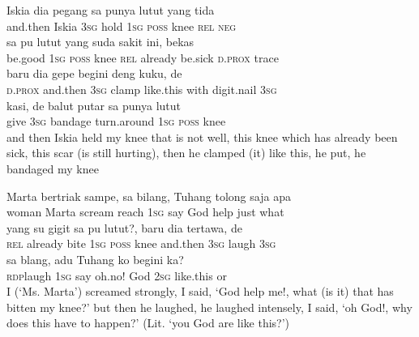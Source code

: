 \ea
{}    {Iskia}    {dia}    {pegang}    {sa}    {punya}    {lutut}   yang    {tida}\\
   {and.then}    {Iskia}    {\textsc{3sg}}    {hold}    {\textsc{1sg}}    {\textsc{poss}}    {knee}   \textsc{rel}    {\textsc{neg}}\\
    {sa}    {pu}    {lutut}    {yang}    {suda}    {sakit}    {ini,}   bekas\\
   {be.good}    {\textsc{1sg}}    {\textsc{poss}}    {knee}    {\textsc{rel}}    {already}    {be.sick}    {\textsc{d.prox}}   trace\\
    {baru}    {dia}    {gepe}    {begini}    {deng}    {kuku,}   de\\
   {\textsc{d.prox}}    {and.then}    {\textsc{3sg}}    {clamp}    {like.this}    {with}    {digit.nail}   \textsc{3sg}\\
\gll kasi,    {de}    {balut}    {putar}    {sa}    {punya}    {lutut}\\
  give    {\textsc{3sg}}    {bandage}    {turn.around}    {\textsc{1sg}}    {\textsc{poss}}    {knee}\\
\glt
and then Iskia held my knee that is not well, this knee which has already been sick, this scar (is still hurting), then he clamped (it) like this, he put, he bandaged my knee
\z

\ea
{}    {Marta}    {bertriak}    {sampe,}    {sa}    {bilang,}    {Tuhang}    {tolong}    {saja}   apa\\
   {woman}    {Marta}    {scream}    {reach}    {\textsc{1sg}}    {say}    {God}    {help}    {just}   what\\
\gll yang    {su}    {gigit}    {sa}    {pu}    {lutut?,}    {baru}    {dia}    {tertawa,}    {de}\\
  \textsc{rel}    {already}    {bite}    {\textsc{1sg}}    {\textsc{poss}}    {knee}    {and.then}    {\textsc{3sg}}    {laugh}    {\textsc{3sg}}\\
    {sa}    {blang,}    {adu}    {Tuhang}   ko    {begini}    {ka?}\\
   {\textsc{rdp}{\Tilde}laugh}    {\textsc{1sg}}    {say}    {oh.no!}    {God}   \textsc{2sg}    {like.this}    {or}\\
\glt
I (‘Ms. Marta’) screamed strongly, I said, ‘God help me!, what (is it) that has bitten my knee?’ but then he laughed, he laughed intensely, I said, ‘oh God!, why does this have to happen?’ (Lit. ‘you God are like this?’)
\z

